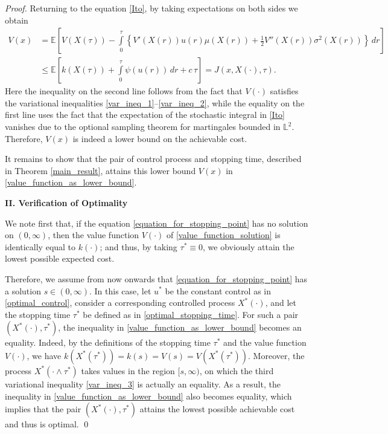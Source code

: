 \documentclass[11pt,tbtags,reqno]{article}
\theoremstyle{definition}
\numberwithin{equation}{section}
\theoremstyle{definition}
\newcommand{\ex}{\mathbb{E}}
\begin{document}
\begin{proof}
Returning to the equation \eqref{Ito}, by taking expectations on both sides we obtain 
\begin{equation}\label{value_function_as_lower_bound}
    \begin{split}
        V(x) &= \ex \left[V(X(\tau)) - \int\limits_{0}^{\tau} \left\{  V'(X(r))u(r)\mu(X(r))+ \frac{1}{2} V''(X(r))\sigma^2(X(r))\right\}\, dr \right]\\
        &\le
        \ex \left[k(X(\tau)) + \int\limits_{0}^{\tau}  \psi(u(r)) \, dr + c\, \tau \right]
        =
        J(x, X(\cdot), \tau).
    \end{split}
\end{equation}
Here the inequality on the second line follows from the fact that $V(\cdot)$ satisfies the variational inequalities \ref{var_ineq_1}--\ref{var_ineq_2}, while the equality on the first line uses the fact that the expectation of the stochastic integral in \eqref{Ito} vanishes due to the optional sampling theorem for martingales bounded in $\mathbb{L}^2$. Therefore, $V(x)$ is indeed a lower bound on the achievable cost. 

It remains to show that the pair of control process and stopping time, described in Theorem \ref{main_result}, attains this lower bound $V(x)$ in \eqref{value_function_as_lower_bound}.

\noindent
\textbf{II. Verification of Optimality}

We note first that, if the equation \eqref{equation_for_stopping_point} has no solution on $(0, \infty)$, then the value function $V(\cdot)$ of \eqref{value_function_solution} is identically equal to $k(\cdot)$; and thus, by taking $\tau^* \equiv 0$, we obviously attain the lowest possible expected cost. 

Therefore, we assume from now onwards that \eqref{equation_for_stopping_point} has a solution $s \in (0, \infty)$. In this case, let $u^*$ be the constant control as in \eqref{optimal_control}, consider a corresponding controlled process $X^*(\cdot)$, and let the stopping time $\tau^*$ be defined as in \eqref{optimal_stopping_time}. For such a pair $(X^*(\cdot), \tau^*)$, the inequality in \eqref{value_function_as_lower_bound} becomes an equality. Indeed, by the definitions of the stopping time $\tau^*$ and the value function $V(\cdot)$, we have $k(X^*(\tau^*)) = k(s) = V(s) = V(X^*(\tau^*))$. Moreover, the process $X^*(\cdot \wedge \tau^*)$ takes values in the region $[s, \infty)$, on which the third variational inequality \ref{var_ineq_3} is actually an equality. As a result, the inequality in \eqref{value_function_as_lower_bound} also becomes equality, which implies that the pair $(X^*(\cdot), \tau^*)$ attains the lowest possible achievable cost and thus is optimal.
\hfill \qed {\par}


\end{proof}
\end{document}
